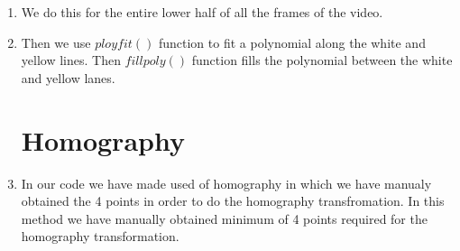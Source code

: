 \documentclass[12pt]{article}
\begin{document}
\begin{enumerate}
\item We do this for the entire lower half of all the frames of the video.

\item Then we use $ployfit()$ function to fit a polynomial along the white and yellow lines. Then $fillpoly()$ function fills the polynomial between the white and yellow lanes.

\section{Homography}

\item In our code we have made used of homography in which we have manualy obtained the 4 points in order to do the homography transfromation. In this method we have manually obtained minimum of 4 points required for the homography transformation.   


\end{enumerate}
\end{document}
